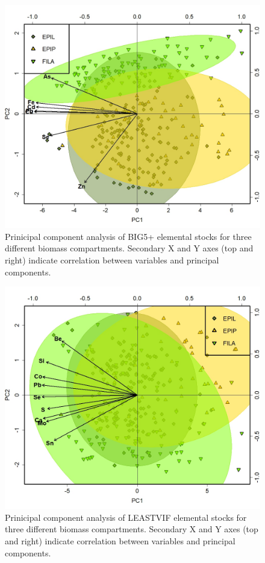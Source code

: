 \documentclass[
]{article}
\begin{document}
\begin{figure}
\includegraphics[width=1\linewidth]{Figures/PCA_2_BIG5PLUS} \caption[Prinicipal component analysis of BIG5+ elemental stocks for three different biomass compartments]{Prinicipal component analysis of BIG5+ elemental stocks for three different biomass compartments. Secondary X and Y axes (top and right) indicate correlation between variables and principal components.}\label{fig:unnamed-chunk-12}
\end{figure}

\FloatBarrier

\begin{figure}
\includegraphics[width=1\linewidth]{Figures/PCA_2_LEASTVIF} \caption[Prinicipal component analysis of LEASTVIF elemental stocks for three different biomass compartments]{Prinicipal component analysis of LEASTVIF elemental stocks for three different biomass compartments. Secondary X and Y axes (top and right) indicate correlation between variables and principal components.}\label{fig:unnamed-chunk-13}
\end{figure}
\end{document}
